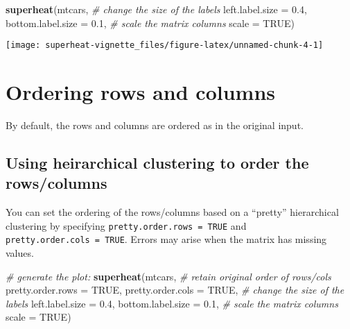 \documentclass[]{book}
\newenvironment{Shaded}{\begin{snugshade}}{\end{snugshade}}
\newcommand{\KeywordTok}[1]{\textcolor[rgb]{0.13,0.29,0.53}{\textbf{{#1}}}}
\newcommand{\DataTypeTok}[1]{\textcolor[rgb]{0.13,0.29,0.53}{{#1}}}
\newcommand{\FloatTok}[1]{\textcolor[rgb]{0.00,0.00,0.81}{{#1}}}
\newcommand{\CommentTok}[1]{\textcolor[rgb]{0.56,0.35,0.01}{\textit{{#1}}}}
\newcommand{\OtherTok}[1]{\textcolor[rgb]{0.56,0.35,0.01}{{#1}}}
\newcommand{\NormalTok}[1]{{#1}}
\theoremstyle{definition}
\theoremstyle{definition}
\theoremstyle{remark}
\begin{document}
\begin{Shaded}
\begin{Highlighting}[]
\KeywordTok{superheat}\NormalTok{(mtcars,}
          \CommentTok{# change the size of the labels}
          \DataTypeTok{left.label.size =} \FloatTok{0.4}\NormalTok{,}
          \DataTypeTok{bottom.label.size =} \FloatTok{0.1}\NormalTok{,}
          \CommentTok{# scale the matrix columns}
          \DataTypeTok{scale =} \OtherTok{TRUE}\NormalTok{)}
\end{Highlighting}
\end{Shaded}

\begin{center}\texttt{[image: superheat-vignette\_files/figure-latex/unnamed-chunk-4-1]} \end{center}

\chapter{Ordering rows and columns}\label{ordering-rows-and-columns}

By default, the rows and columns are ordered as in the original input.

\hypertarget{h-order}{\section{Using heirarchical clustering to order
the rows/columns}\label{h-order}}

You can set the ordering of the rows/columns based on a ``pretty''
hierarchical clustering by specifying
\texttt{pretty.order.rows\ =\ TRUE} and
\texttt{pretty.order.cols\ =\ TRUE}. Errors may arise when the matrix
has missing values.

\begin{Shaded}
\begin{Highlighting}[]
\CommentTok{# generate the plot:}
\KeywordTok{superheat}\NormalTok{(mtcars,}
          \CommentTok{# retain original order of rows/cols}
          \DataTypeTok{pretty.order.rows =} \OtherTok{TRUE}\NormalTok{,}
          \DataTypeTok{pretty.order.cols =} \OtherTok{TRUE}\NormalTok{,}
          \CommentTok{# change the size of the labels}
          \DataTypeTok{left.label.size =} \FloatTok{0.4}\NormalTok{,}
          \DataTypeTok{bottom.label.size =} \FloatTok{0.1}\NormalTok{,}
          \CommentTok{# scale the matrix columns}
          \DataTypeTok{scale =} \OtherTok{TRUE}\NormalTok{)}
\end{Highlighting}
\end{Shaded}
\end{document}
